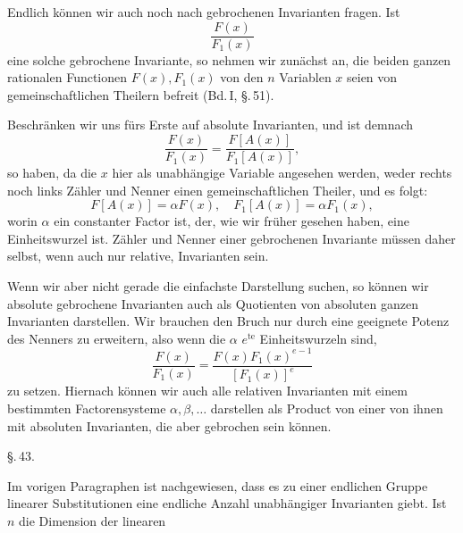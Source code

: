 Endlich können wir auch noch nach gebrochenen Invarianten fragen. Ist
\[
\frac{F(x)}{F_1(x)}
\]
eine solche gebrochene Invariante, so nehmen wir zunächst an, die beiden ganzen rationalen Functionen $F(x), F_1(x)$ von den $n$ Variablen $x$ seien von gemeinschaftlichen Theilern befreit (Bd.\,I, \S.\,51).

Beschränken wir uns fürs Erste auf absolute Invarianten, und ist demnach
\[
\frac{F(x)}{F_1(x)} = \frac{F[A(x)]}{F_1[A(x)]},
\]
so haben, da die $x$ hier als unabhängige Variable angesehen werden, weder rechts noch links Zähler und Nenner einen gemeinschaftlichen Theiler, und es folgt:
\[
F[A(x)] = \alpha F(x), \quad F_1[A(x)] = \alpha F_1(x),
\]
worin $\alpha$ ein constanter Factor ist, der, wie wir früher gesehen haben, eine Einheitswurzel ist. Zähler und Nenner einer gebrochenen Invariante müssen daher selbst, wenn auch nur relative, Invarianten sein.

Wenn wir aber nicht gerade die einfachste Darstellung suchen, so können wir absolute gebrochene Invarianten auch als Quotienten von absoluten ganzen Invarianten darstellen. Wir brauchen den Bruch nur durch eine geeignete Potenz des Nenners zu erweitern, also wenn die $\alpha$ $e^{\text{te}}$ Einheitswurzeln sind,
\[
\frac{F(x)}{F_1(x)} = \frac{F(x) F_1(x)^{e-1}}{[F_1(x)]^e}
\]
zu setzen. Hiernach können wir auch alle relativen Invarianten mit einem bestimmten Factorensysteme $\alpha, \beta, \ldots$ darstellen als Product von einer von ihnen mit absoluten Invarianten, die aber gebrochen sein können.

\begin{center}
\S.\,43.

\end{center}

Im vorigen Paragraphen ist nachgewiesen, dass es zu einer endlichen Gruppe linearer Substitutionen eine endliche Anzahl unabhängiger Invarianten giebt. Ist $n$ die Dimension der linearen
